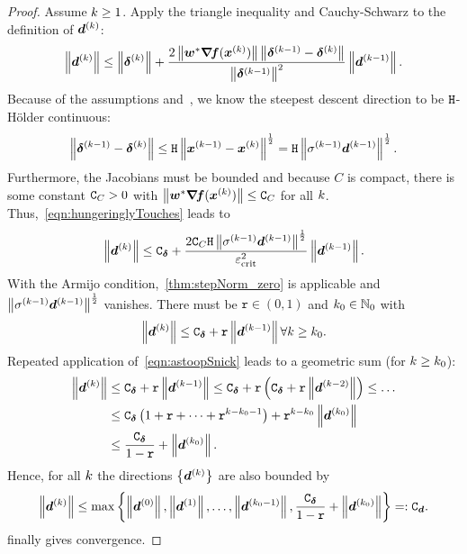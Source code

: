 \documentclass{article}
\theoremstyle{plain}
\theoremstyle{definition}
\begin{document}
\begin{proof}
Assume $k \geq 1$.
Apply the triangle inequality and Cauchy-Schwarz
to the definition of $\bm{d}^{(k)}$:
\begin{equation}
	\left\|\bm{d}^{(k)}\right\|
	\leq
	\left\|\bm{\delta}^{(k)}\right\|
	+ 
	\frac{
		2 
		\left\|\bm{w}^*\bm{\nabla}\!\bm{f}(\bm{x}^{(k)})\right\|
		\left\|\bm{\delta}^{(k-1)} - \bm{\delta}^{(k)}\right\|
	}{
		\left\|\bm{\delta}^{(k-1)}\right\|^2
	}
	\left\|\bm{d}^{(k-1)}\right\|.
	\label{eqn:hungeringlyTouches}
\end{equation}
Because of the assumptions and~\cite{svaiterMultiobjectiveSteepestDescent2018},
we know the steepest descent direction to be $\mathtt{H}$-Hölder
continuous:
$$
\left\|\bm{\delta}^{(k-1)} - \bm{\delta}^{(k)}\right\|
\leq
\mathtt{H}
\left\|\bm{x}^{(k-1)} - \bm{x}^{(k)}\right\|^\frac{1}{2}
=
\mathtt{H}
\left\|\sigma^{(k-1)}\bm{d}^{(k-1)}\right\|^\frac{1}{2}.
$$
Furthermore, the Jacobians must be bounded and because
$C$ is compact, there is some constant $\mathtt C_{C} > 0$
with $\left\|\bm{w}^*\bm{\nabla}\!\bm{f}(\bm{x}^{(k)})\right\| \leq \mathtt C_{C}$ for all $k$.
Thus,~\eqref{eqn:hungeringlyTouches} leads to
\begin{equation}
	\left\|\bm{d}^{(k)}\right\|
	\leq
	\mathtt C_{\bm{\delta}}
	+
	\frac{
		2\mathtt C_{C}
			\mathtt{H}\left\|\sigma^{(k-1)}\bm{d}^{(k-1)}\right\|^\frac{1}{2}
		}{
			\varepsilon_{\mathrm{crit}}^2
		}
	\left\|\bm{d}^{(k-1)}\right\|.
\end{equation}
With the Armijo condition,~\cref{thm:stepNorm_zero} is
applicable and $\left\|\sigma^{(k-1)} \bm{d}^{(k-1)}\right\|^\frac{1}{2}$
vanishes.
There must be $\mathtt{r}\in(0,1)$ and 
$k_0\in \mathbb N_0$ with 
\begin{equation}
	\left\|\bm{d}^{(k)}\right\|
	\leq
	\mathtt C_{\bm{\delta}}
	+ 
	\mathtt{r}
	\left\|\bm{d}^{(k-1)}\right\|
	\forall 
	k \geq k_0
	.
	\label{eqn:astoopSnick}
\end{equation}
Repeated application of~\eqref{eqn:astoopSnick}
leads to a geometric sum (for $k\ge k_0$):
\begin{align*}
	\left\|\bm{d}^{(k)}\right\|
	&\leq
	\mathtt C_{\bm{\delta}}
	+ 
	\mathtt{r}
	\left\|\bm{d}^{(k-1)}\right\|
	\leq
	\mathtt C_{\bm{\delta}}
	+ 
	\mathtt{r}
	\left( 
		\mathtt C_{\bm{\delta}}
		+ 
		\mathtt{r}
		\left\|\bm{d}^{(k-2)}\right\|
	\right)
	\leq
	\dotso
	\\
	&\leq
	\mathtt C_{\bm{\delta}}
	\left(
	1 + \mathtt{r} + \dotsm + \mathtt{r}^{k - k_0 - 1}
	\right)
	+
	\mathtt{r}^{k-k_0}
	\left\|\bm{d}^{(k_0)}\right\|
	\\
	&\leq
	\frac{\mathtt C_{\bm{\delta}}}{1-\mathtt{r}}
	+
	\left\|\bm{d}^{(k_0)}\right\|
	.
\end{align*}
Hence, for all $k$ the directions $\left\{\bm{d}^{(k)}\right\}$ are also
bounded by
$$
\left\|\bm{d}^{(k)}\right\|
\leq
\max 
\left\{
	\left\|\bm{d}^{(0)}\right\|,
	\left\|\bm{d}^{(1)}\right\|,
	\ldots,
	\left\|\bm{d}^{(k_0-1)}\right\|,
	\frac{\mathtt C_{\bm{\delta}}}{1-\mathtt{r}}
	+
	\left\|\bm{d}^{(k_0)}\right\|
\right\} =: \mathtt C_{\bm{d}}.
$$
 finally gives convergence.
\end{proof}
\end{document}
